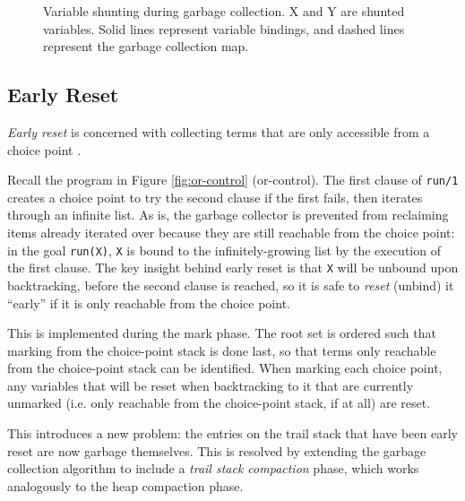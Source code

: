 \begin{enumerate}
\begin{figure}[H]
\caption{Variable shunting during garbage collection. X and Y are shunted variables. Solid lines represent variable bindings, and dashed lines represent the garbage collection map.}
\label{fig:shunt-cases}
\end{figure}

\end{enumerate}

\subsection{Early Reset}

\label{sec:early-reset}

\emph{Early reset} is concerned with collecting terms that are only accessible from a choice point \cite{applebyGarbargecollectionProlog1988}.

Recall the program in Figure \ref{fig:or-control} (or-control). The first clause of \texttt{run/1} creates a choice point to try the second clause if the first fails, then iterates through an infinite list. As is, the garbage collector is prevented from reclaiming items already iterated over because they are still reachable from the choice point: in the goal \texttt{run(X)}, \texttt{X} is bound to the infinitely-growing list by the execution of the first clause. The key insight behind early reset is that \texttt{X} will be unbound upon backtracking, before the second clause is reached, so it is safe to \emph{reset} (unbind) it ``early'' if it is only reachable from the choice point.

This is implemented during the mark phase. The root set is ordered such that marking from the choice-point stack is done last, so that terms only reachable from the choice-point stack can be identified. When marking each choice point, any variables that will be reset when backtracking to it that are currently unmarked (i.e. only reachable from the choice-point stack, if at all) are reset.

This introduces a new problem: the entries on the trail stack that have been early reset are now garbage themselves. This is resolved by extending the garbage collection algorithm to include a \emph{trail stack compaction} phase, which works analogously to the heap compaction phase.

